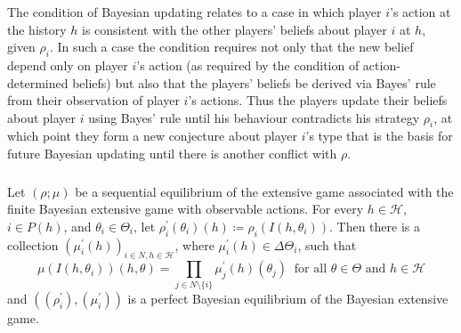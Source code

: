 \documentclass[UTF8,11pt,colorlinks,compress,openany]{beamer}%
\begin{document}
\begin{frame}\frametitle{}
The condition of Bayesian updating relates to a case in which player $i$'s action at the history $h$ is consistent with the other players' beliefs about player $i$ at $h$, given $\rho_i$. In such a case the condition requires not only that the new belief depend only on player $i$'s action (as required by the condition of action-determined beliefs) but also that the players' beliefs be derived via Bayes' rule from their observation of player $i$'s actions. Thus the players update their beliefs about player $i$ using Bayes' rule until his behaviour contradicts his strategy $\rho_i$, at which point they form a new conjecture about player $i$'s type that is the basis for future Bayesian updating until there is another conflict with $\rho$.
\end{frame}

\begin{frame}\frametitle{}
\begin{theorem}
	Let $(\rho;\mu)$ be a sequential equilibrium of the extensive game associated with the finite Bayesian extensive game with observable actions. For every $h\in\mathcal{H}$, $i\in P(h)$, and $\theta_i\in\Theta_i$, let $\rho_i^\prime(\theta_i)(h)\coloneqq \rho_i(I(h,\theta_i))$. Then there is a collection $(\mu_i^\prime(h))_{i\in N,h\in\mathcal{H}}$, where $\mu_i^\prime(h)\in\Delta\Theta_i$, such that
	\[
	\mu(I(h,\theta_i))(h,\theta)=\prod\limits_{j\in N\setminus\{i\}}\mu_j^\prime(h)(\theta_j)\;\;\text{for all $\theta\in\Theta$ and $h\in\mathcal{H}$}
	\]
	and $((\rho_i^\prime),(\mu_i^\prime))$ is a perfect Bayesian equilibrium of the Bayesian extensive game.
\end{theorem}
\end{frame}
\end{document}
